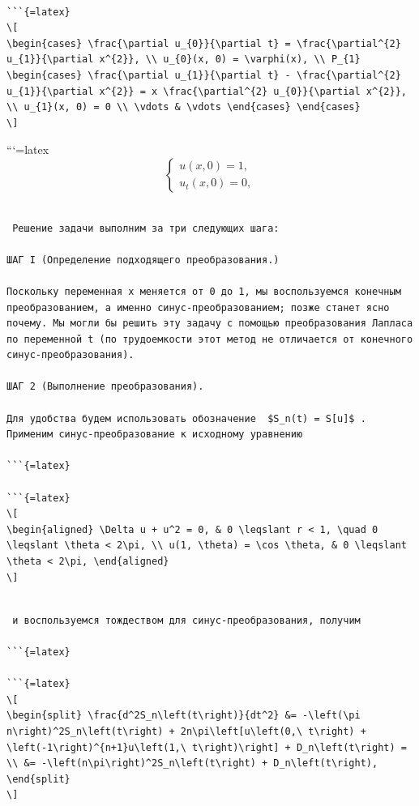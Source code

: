 \documentclass[
]{article}
\begin{document}
\begin{verbatim}

```{=latex}
\[
\begin{cases} \frac{\partial u_{0}}{\partial t} = \frac{\partial^{2} u_{1}}{\partial x^{2}}, \\ u_{0}(x, 0) = \varphi(x), \\ P_{1} \begin{cases} \frac{\partial u_{1}}{\partial t} - \frac{\partial^{2} u_{1}}{\partial x^{2}} = x \frac{\partial^{2} u_{0}}{\partial x^{2}}, \\ u_{1}(x, 0) = 0 \\ \vdots & \vdots \end{cases} \end{cases}
\]
\end{verbatim}

```{=latex}
\[
\begin{cases} u(x, 0) = 1, \\ u_t(x, 0) = 0, \end{cases}
\]

\begin{verbatim}

 Решение задачи выполним за три следующих шага:

ШАГ І (Определение подходящего преобразования.)

Поскольку переменная x меняется от 0 до 1, мы воспользуемся конечным преобразованием, а именно синус-преобразованием; позже станет ясно почему. Мы могли бы решить эту задачу с помощью преобразования Лапласа по переменной t (по трудоемкости этот метод не отличается от конечного синус-преобразования).

ШАГ 2 (Выполнение преобразования).

Для удобства будем использовать обозначение  $S_n(t) = S[u]$ . Применим синус-преобразование к исходному уравнению

```{=latex}

```{=latex}
\[
\begin{aligned} \Delta u + u^2 = 0, & 0 \leqslant r < 1, \quad 0 \leqslant \theta < 2\pi, \\ u(1, \theta) = \cos \theta, & 0 \leqslant \theta < 2\pi, \end{aligned}
\]
\end{verbatim}

\begin{verbatim}

 и воспользуемся тождеством для синус-преобразования, получим

```{=latex}

```{=latex}
\[
\begin{split} \frac{d^2S_n\left(t\right)}{dt^2} &= -\left(\pi n\right)^2S_n\left(t\right) + 2n\pi\left[u\left(0,\ t\right) + \left(-1\right)^{n+1}u\left(1,\ t\right)\right] + D_n\left(t\right) = \\ &= -\left(n\pi\right)^2S_n\left(t\right) + D_n\left(t\right), \end{split}
\]
\end{verbatim}
\end{document}
